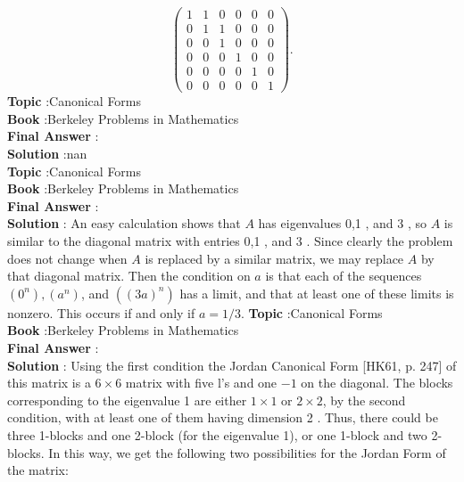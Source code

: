 \documentclass[10pt]{article}
\begin{document}
$$
\left(\begin{array}{llllll}
1 & 1 & 0 & 0 & 0 & 0 \\
0 & 1 & 1 & 0 & 0 & 0 \\
0 & 0 & 1 & 0 & 0 & 0 \\
0 & 0 & 0 & 1 & 0 & 0 \\
0 & 0 & 0 & 0 & 1 & 0 \\
0 & 0 & 0 & 0 & 0 & 1
\end{array}\right) .
$$
\textbf{Topic} :Canonical Forms \\
\textbf{Book} :Berkeley Problems in Mathematics\\
\textbf{Final Answer} :\\


\textbf{Solution} :nan\\
\textbf{Topic} :Canonical Forms \\
\textbf{Book} :Berkeley Problems in Mathematics\\
\textbf{Final Answer} :\\


\textbf{Solution} : An easy calculation shows that $A$ has eigenvalues 0,1 , and 3 , so $A$ is similar to the diagonal matrix with entries 0,1 , and 3 . Since clearly the problem does not change when $A$ is replaced by a similar matrix, we may replace $A$ by that diagonal matrix. Then the condition on $a$ is that each of the sequences $\left(0^{n}\right),\left(a^{n}\right)$, and $\left((3 a)^{n}\right)$ has a limit, and that at least one of these limits is nonzero. This occurs if and only if $a=1 / 3$.
\textbf{Topic} :Canonical Forms \\
\textbf{Book} :Berkeley Problems in Mathematics\\
\textbf{Final Answer} :\\


\textbf{Solution} : Using the first condition the Jordan Canonical Form [HK61, p. 247] of this matrix is a $6 \times 6$ matrix with five l's and one $-1$ on the diagonal. The blocks corresponding to the eigenvalue 1 are either $1 \times 1$ or $2 \times 2$, by the second condition, with at least one of them having dimension 2 . Thus, there could be three 1-blocks and one 2-block (for the eigenvalue 1), or one 1-block and two 2-blocks. In this way, we get the following two possibilities for the Jordan Form of the matrix:
\end{document}
